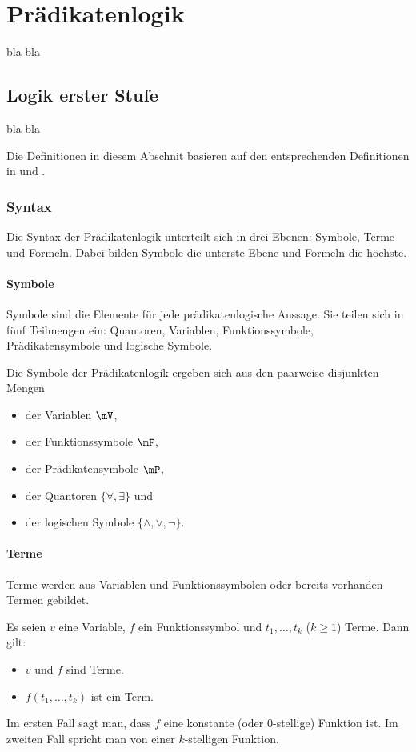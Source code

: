 \chapter{Prädikatenlogik}

bla bla

\section{Logik erster Stufe}

bla bla

Die Definitionen in diesem Abschnit basieren auf den entsprechenden Definitionen in \cite{kreuzer2006logik} und \cite{wikiD:FOL}.

\subsection{Syntax}
Die Syntax der Prädikatenlogik unterteilt sich in drei Ebenen: Symbole, Terme und Formeln. Dabei bilden Symbole die unterste Ebene und Formeln die höchste.

\subsubsection{Symbole}
Symbole sind die Elemente für jede prädikatenlogische Aussage. Sie teilen sich in fünf Teilmengen ein: Quantoren, Variablen, Funktionssymbole, Prädikatensymbole und logische Symbole.

\begin{mydef}[Symbole]
    Die Symbole der Prädikatenlogik ergeben sich aus den paarweise disjunkten Mengen
   \begin{itemize}
        \item der Variablen $\mV$,
        \item der Funktionssymbole $\mF$,
        \item der Prädikatensymbole $\mP$,
        \item der Quantoren $\{\forall,\exists\}$ und
        \item der logischen Symbole $\{\land,\lor,\lnot\}$.
    \end{itemize}
\end{mydef}

\subsubsection{Terme}
Terme werden aus Variablen und Funktionssymbolen oder bereits vorhanden Termen gebildet.
\begin{mydef}[Terme]
    Es seien $v$ eine Variable, $f$ ein Funktionssymbol und $t_1,\ldots,t_k$ ($k\geq 1$) Terme. Dann gilt:
    \begin{itemize}
       \item  $v$ und $f$ sind Terme.
       \item  $f(t_1,\ldots,t_k)$ ist ein Term.
    \end{itemize}
    Im ersten Fall sagt man, dass $f$ eine konstante (oder $0$-stellige) Funktion ist. Im zweiten Fall spricht man von einer $k$-stelligen Funktion.
\end{mydef}

